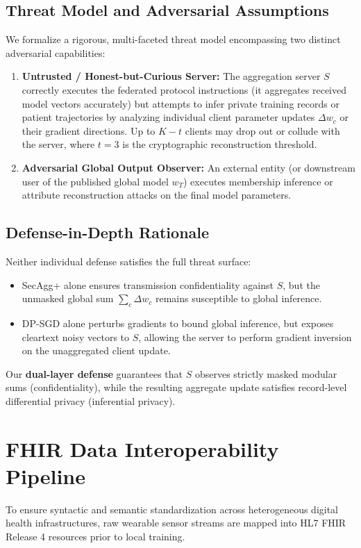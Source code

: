 \documentclass[journal,twocolumn,10pt]{IEEEtran}
\begin{document}
\subsection{Threat Model and Adversarial Assumptions}
We formalize a rigorous, multi-faceted threat model encompassing two distinct adversarial capabilities:
\begin{enumerate}
    \item \textbf{Untrusted / Honest-but-Curious Server:} The aggregation server $S$ correctly executes the federated protocol instructions (it aggregates received model vectors accurately) but attempts to infer private training records or patient trajectories by analyzing individual client parameter updates $\Delta w_c$ or their gradient directions. Up to $K - t$ clients may drop out or collude with the server, where $t=3$ is the cryptographic reconstruction threshold.
    \item \textbf{Adversarial Global Output Observer:} An external entity (or downstream user of the published global model $w_T$) executes membership inference or attribute reconstruction attacks on the final model parameters.
\end{enumerate}

\subsection{Defense-in-Depth Rationale}
Neither individual defense satisfies the full threat surface:
\begin{itemize}
    \item SecAgg+ alone ensures transmission confidentiality against $S$, but the unmasked global sum $\sum_{c} \Delta w_c$ remains susceptible to global inference.
    \item DP-SGD alone perturbs gradients to bound global inference, but exposes cleartext noisy vectors to $S$, allowing the server to perform gradient inversion on the unaggregated client update.
\end{itemize}
Our \textbf{dual-layer defense} guarantees that $S$ observes strictly masked modular sums (confidentiality), while the resulting aggregate update satisfies record-level differential privacy (inferential privacy).

\section{FHIR Data Interoperability Pipeline}
To ensure syntactic and semantic standardization across heterogeneous digital health infrastructures, raw wearable sensor streams are mapped into HL7 FHIR Release 4 resources prior to local training.
\end{document}
